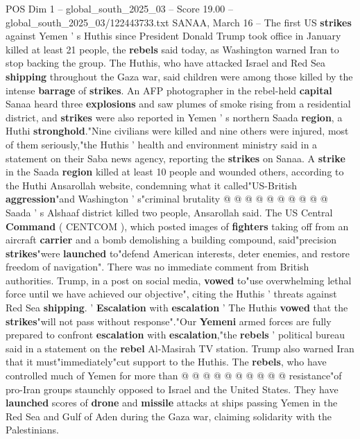 \begin{textsample}{POS Dim 1 – global\_south\_2025\_03 – Score 19.00 – global\_south\_2025\_03/122443733.txt}  \label{ex:f1_pos_293}
SANAA, March 16 -- The first US \textbf{strikes} against Yemen ' s Huthis since President Donald Trump took office in January killed at least 21 people, the \textbf{rebels} said today, as Washington warned Iran to stop backing the group.
The Huthis, who have attacked Israel and Red Sea \textbf{shipping} throughout the Gaza war, said children were among those killed by the intense \textbf{barrage} of \textbf{strikes}.
An AFP photographer in the rebel-held \textbf{capital} Sanaa heard three \textbf{explosions} and saw plumes of smoke rising from a residential district, and \textbf{strikes} were also reported in Yemen ' s northern Saada \textbf{region}, a Huthi \textbf{stronghold}."Nine civilians were killed and nine others were injured, most of them seriously,"the Huthis ' health and environment ministry said in a statement on their Saba news agency, reporting the \textbf{strikes} on Sanaa.
A \textbf{strike} in the Saada \textbf{region} killed at least 10 people and wounded others, according to the Huthi Ansarollah website, condemning what it called"US-British \textbf{aggression}"and Washington ' s"criminal brutality @ @ @ @ @ @ @ @ @ @ Saada ' s Alshaaf district killed two people, Ansarollah said.
The US Central \textbf{Command} ( CENTCOM ), which posted images of \textbf{fighters} taking off from an aircraft \textbf{carrier} and a bomb demolishing a building compound, said"precision \textbf{strikes}"were \textbf{launched} to"defend American interests, deter enemies, and restore freedom of navigation".
There was no immediate comment from British authorities.
Trump, in a post on social media, \textbf{vowed} to"use overwhelming lethal force until we have achieved our objective", citing the Huthis ' threats against Red Sea \textbf{shipping}. ' \textbf{Escalation} with \textbf{escalation} ' The Huthis \textbf{vowed} that the \textbf{strikes}"will not pass without response"."Our \textbf{Yemeni} armed forces are fully prepared to confront \textbf{escalation} with \textbf{escalation},"the \textbf{rebels} ' political bureau said in a statement on the \textbf{rebel} Al-Masirah TV station.
Trump also warned Iran that it must"immediately"cut support to the Huthis.
The \textbf{rebels}, who have controlled much of Yemen for more than @ @ @ @ @ @ @ @ @ @ resistance"of pro-Iran groups staunchly opposed to Israel and the United States.
They have \textbf{launched} scores of \textbf{drone} and \textbf{missile} attacks at ships passing Yemen in the Red Sea and Gulf of Aden during the Gaza war, claiming solidarity with the Palestinians.

\end{textsample}
